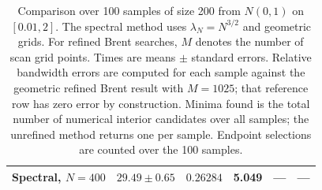 \begin{table}[htbp]
\begin{tabular}{lccccc}
        Spectral, $N=400$ & $29.49 \pm 0.65$ & $0.26284$ & 5.049 & --- & --- \\
        \bottomrule
    \end{tabular}
    \caption{Comparison over 100 samples of size 200 from $N(0,1)$ on $[0.01,2]$. The spectral method uses $\lambda_N=N^{3/2}$ and geometric grids. For refined Brent searches, $M$ denotes the number of scan grid points. Times are means $\pm$ standard errors. Relative bandwidth errors are computed for each sample against the geometric refined Brent result with $M=1025$; that reference row has zero error by construction. Minima found is the total number of numerical interior candidates over all samples; the unrefined method returns one per sample. Endpoint selections are counted over the 100 samples.}
\end{table}

